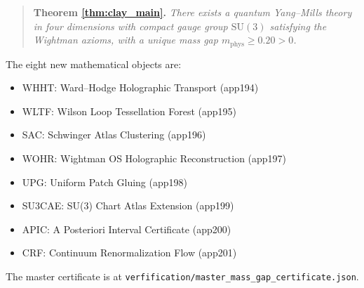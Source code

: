 \begin{quote}
\textbf{Theorem \ref{thm:clay_main}.} \emph{There exists a quantum
Yang--Mills theory in four dimensions with compact gauge group
$\mathrm{SU}(3)$ satisfying the Wightman axioms, with a unique mass
gap $m_{\mathrm{phys}}\ge 0.20>0$.}
\end{quote}

The eight new mathematical objects are:
\begin{itemize}
\item WHHT: Ward--Hodge Holographic Transport (app194)
\item WLTF: Wilson Loop Tessellation Forest (app195)
\item SAC: Schwinger Atlas Clustering (app196)
\item WOHR: Wightman OS Holographic Reconstruction (app197)
\item UPG: Uniform Patch Gluing (app198)
\item SU3CAE: SU(3) Chart Atlas Extension (app199)
\item APIC: A Posteriori Interval Certificate (app200)
\item CRF: Continuum Renormalization Flow (app201)
\end{itemize}
The master certificate is at
\texttt{verfification/master\_mass\_gap\_certificate.json}.
\endinput
